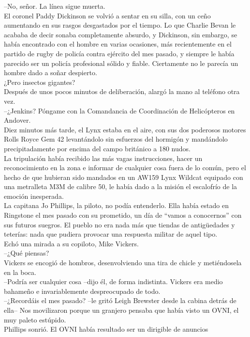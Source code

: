 --No, señor. La línea sigue muerta.\\
El coronel Paddy Dickinson se volvió a sentar en su silla, con un ceño
aumentando en sus rasgos desgastados por el tiempo. Lo que Charlie Bevan
le acababa de decir sonaba completamente absurdo, y Dickinson, sin
embargo, se había encontrado con el hombre en varias ocasiones, más
recientemente en el partido de rugby de policía contra ejército del mes
pasado, y siempre le había parecido ser un policía profesional sólido y
fiable. Ciertamente no le parecía un hombre dado a soñar despierto.\\
¿Pero insectos gigantes?\\
Después de unos pocos minutos de deliberación, alargó la mano al
teléfono otra vez.\\
--¿Jenkins? Póngame con la Comandancia de Coordinación de Helicópteros
en Andover.\\[2\baselineskip]Diez minutos más tarde, el Lynx estaba en
el aire, con sus dos poderosos motores Rolls Royce Gem 42 levantándolo
sin esfuerzos del hormigón y mandándolo precipitadamente por encima del
campo británico a 180 nudos.\\
La tripulación había recibido las más vagas instrucciones, hacer un
reconocimiento en la zona e informar de cualquier cosa fuera de lo
común, pero el hecho de que hubieran sido mandados en un AW159 Lynx
Wildcat equipado con una metralleta M3M de calibre 50, le había dado a
la misión el escalofrío de la emoción inesperada.\\
La capitana Jo Phillips, la piloto, no podía entenderlo. Ella había
estado en Ringstone el mes pasado con su prometido, un día de ``vamos a
conocernos'' con sus futuros suegros. El pueblo no era nada más que
tiendas de antigüedades y teterías: nada que pudiera provocar una
respuesta militar de aquel tipo.\\
Echó una mirada a su copiloto, Mike Vickers.\\
--¿Qué piensas?\\
Vickers se encogió de hombros, desenvolviendo una tira de chicle y
metiéndosela en la boca.\\
--Podría ser cualquier cosa --dijo él, de forma indistinta. Vickers era
medio bahameño e invariablemente despreocupado de todo.\\
--¿Recordáis el mes pasado? --le gritó Leigh Brewster desde la cabina
detrás de ella-- Nos movilizaron porque un granjero pensaba que había
visto un OVNI, el muy paleto estúpido.\\
Phillips sonrió. El OVNI había resultado ser un dirigible de anuncios
